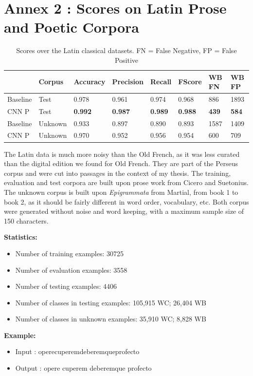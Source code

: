 \documentclass{jdmdh}
\begin{document}
\section{Annex 2 : Scores on Latin Prose and Poetic Corpora}

\begin{table}[H]
\centering
\begin{tabular}{llllllll}
\hline
 & Corpus & Accuracy & Precision & Recall & FScore & WB FN & WB FP \\ \hline
Baseline & Test & 0.978 & 0.961 & 0.974 & 0.968 & 886 & 1893 \\
CNN P & Test & \textbf{0.992} & \textbf{0.987} & \textbf{0.989} & \textbf{0.988} & \textbf{439} & \textbf{584} \\ \hline
Baseline & Unknown & 0.933 & 0.897 & 0.890 & 0.893 & 1587 & 1409 \\
CNN P & Unknown & 0.970 & 0.952 & 0.956 & 0.954 & 600 & 709 \\ \hline
\end{tabular}
\caption{Scores over the Latin classical datasets. FN = False Negative, FP = False Positive}
\label{tab:latin_corpora}
\end{table}

The Latin data is much more noisy than the Old French, as it was less curated than the digital edition we found for Old French. They are part of the Perseus corpus \citet{perseus} and were cut into passages in the context of my thesis. The training, evaluation and test corpora are built upon prose work from Cicero and Suetonius. The unknown corpus is built upon \textit{Epigrammata} from Martial, from book 1 to book 2, as it should be fairly different in word order, vocabulary, etc. Both corpus were generated without noise and word keeping, with a maximum sample size of 150 characters.

\textbf{Statistics:}
\begin{itemize}
\item Number of training examples: 30725
\item Number of evaluation examples: 3558
\item Number of testing examples: 4406
\item Number of classes in testing examples: 105,915 WC; 26,404 WB
\item Number of classes in unknown examples: 35,910 WC; 8,828 WB
\end{itemize}

\textbf{Example:}

\begin{itemize}
    \item Input : operecuperemdeberemqueprofecto
    \item Output : opere cuperem deberemque profecto

\end{itemize}
\end{document}
